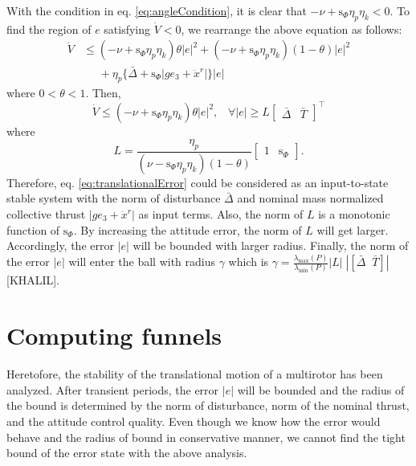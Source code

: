 \documentclass[letterpaper, 10 pt, conference]{ieeeconf}  %
\begin{document}
With the condition in eq. \eqref{eq:angleCondition}, it is clear that $-\nu+\text{s}_\Phi\eta_p\eta_k < 0$. 
To find the region of $e$ satisfying $\dot{V} < 0$, we rearrange the above equation as follows:
\begin{align}
\dot{V} &\leq (-\nu+\text{s}_\Phi\eta_p\eta_k)\theta|e|^2 + (-\nu+\text{s}_\Phi\eta_p\eta_k)(1-\theta)|e|^2 \nonumber \\
&\;\;\;\;\;+\eta_p\{\bar{\Delta} + \text{s}_\Phi |ge_3+\ddot{x}^r|\}|e| \nonumber 
\end{align}
where $0<\theta<1$. 
Then, 
\begin{equation}
\dot{V} \leq (-\nu+\text{s}_\Phi\eta_p\eta_k)\theta|e|^2,\;\;\; \forall |e| \geq L \left[\begin{array}{ll}\bar{\Delta} & \bar{T}\end{array}\right]^\intercal \nonumber 
\end{equation}
where
\begin{equation}
L = \frac{\eta_p}{(\nu-\text{s}_\Phi\eta_p\eta_k)(1-\theta)}[\begin{array}{cc}1 & \text{s}_\Phi \end{array}]. \nonumber
\end{equation}
Therefore, eq. \eqref{eq:translationalError} could be considered as an input-to-state stable system with the norm of disturbance $\bar{\Delta}$ and nominal mass normalized collective thrust $|ge_3 + \ddot{x}^r|$ as input terms.
Also, the norm of $L$ is a monotonic function of $\text{s}_\Phi$. By increasing the attitude error, the norm of $L$ will get larger. 
Accordingly, the error $|e|$ will be bounded with larger radius. 
Finally, the norm of the error $|e|$ will enter the ball with radius $\gamma$ which is $\gamma = \frac{\lambda_{\max}(P)}{\lambda_{\min}(P)}|L|\;|[\bar{\Delta}\;\;\bar{T}]|$ [KHALIL].

\section{Computing funnels}
Heretofore, the stability of the translational motion of a multirotor has been analyzed. 
After transient periods, the error $|e|$ will be bounded and the radius of the bound is determined by the norm of disturbance, norm of the nominal thrust, and the attitude control quality. 
Even though we know how the error would behave and the radius of bound in conservative manner, we cannot find the tight bound of the error state with the above analysis. 
\end{document}

